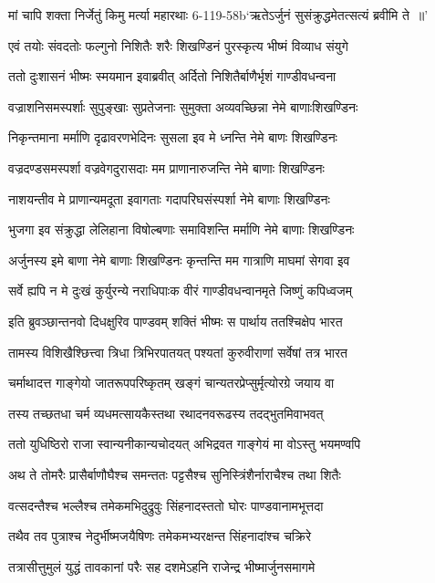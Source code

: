 \twolineshloka
{मां चापि शक्ता निर्जेतुं किमु मर्त्या महारथाः}
{6-119-58b`ऋतेऽर्जुनं सुसंक्रुद्धमेतत्सत्यं ब्रवीमि ते ॥'}


\twolineshloka
{एवं तयोः संवदतोः फल्गुनो निशितैः शरैः}
{शिखण्डिनं पुरस्कृत्य भीष्मं विव्याध संयुगे}


\twolineshloka
{ततो दुःशासनं भीष्मः स्मयमान इवाब्रवीत्}
{अर्दितो निशितैर्बाणैर्भृशं गाण्डीवधन्वना}


\twolineshloka
{वज्राशनिसमस्पर्शाः सुपुङ्खाः सुप्रतेजनाः}
{सुमुक्ता अव्यवच्छिन्ना नेमे बाणाःशिखण्डिनः}


\twolineshloka
{निकृन्तमाना मर्माणि दृढावरणभेदिनः}
{सुसला इव मे ध्नन्ति नेमे बाणः शिखण्डिनः}


\twolineshloka
{वज्रदण्डसमस्पर्शा वज्रवेगदुरासदाः}
{मम प्राणानारुजन्ति नेमे बाणाः शिखण्डिनः}


\twolineshloka
{नाशयन्तीव मे प्राणान्यमदूता इवागताः}
{गदापरिघसंस्पर्शा नेमे बाणाः शिखण्डिनः}


\twolineshloka
{भुजगा इव संक्रुद्धा लेलिहाना विषोल्बणाः}
{समाविशन्ति मर्माणि नेमे बाणाः शिखण्डिनः}


\twolineshloka
{अर्जुनस्य इमे बाणा नेमे बाणाः शिखण्डिनः}
{कृन्तन्ति मम गात्राणि माघमां सेगवा इव}


\twolineshloka
{सर्वे ह्यपि न मे दुःखं कुर्युरन्ये नराधिपाःक}
{वीरं गाण्डीवधन्वानमृते जिष्णुं कपिध्वजम्}


\twolineshloka
{इति ब्रुवञ्छान्तनवो दिधक्षुरिव पाण्डवम्}
{शक्तिं भीष्मः स पार्थाय ततश्चिक्षेप भारत}


\twolineshloka
{तामस्य विशिखैश्छित्त्वा त्रिधा त्रिभिरपातयत्}
{पश्यतां कुरुवीराणां सर्वेषां तत्र भारत}


\twolineshloka
{चर्माथादत्त गाङ्गेयो जातरूपपरिष्कृतम्}
{खङ्गं चान्यतरप्रेप्सुर्मृत्योरग्रे जयाय वा}


\twolineshloka
{तस्य तच्छतधा चर्म व्यधमत्सायकैस्तथा}
{रथादनवरूढस्य तदद्भुतमिवाभवत्}


\twolineshloka
{ततो युधिष्ठिरो राजा स्वान्यनीकान्यचोदयत्}
{अभिद्रवत गाङ्गेयं मा वोऽस्तु भयमण्वपि}


\twolineshloka
{अथ ते तोमरैः प्रासैर्बाणौघैश्च समन्ततः}
{पट्टसैश्च सुनिस्त्रिंशैर्नाराचैश्च तथा शितैः}


\twolineshloka
{वत्सदन्तैश्च भल्लैश्च तमेकमभिदुद्रुवुः}
{सिंहनादस्ततो घोरः पाण्डवानामभूत्तदा}


\twolineshloka
{तथैव तव पुत्राश्च नेदुर्भीष्मजयैषिणः}
{तमेकमभ्यरक्षन्त सिंहनादांश्च चक्रिरे}


\twolineshloka
{तत्रासीत्तुमुलं युद्धं तावकानां परैः सह}
{दशमेऽहनि राजेन्द्र भीष्मार्जुनसमागमे}


